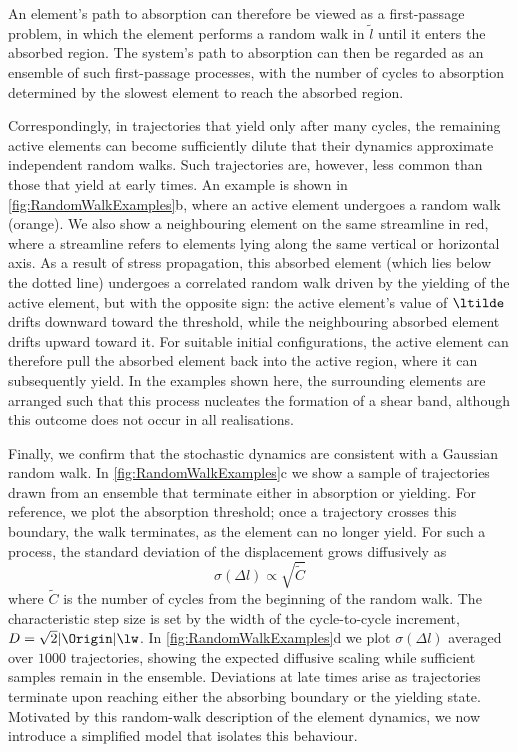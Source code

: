 \documentclass[asymmetricmargins]{library/duthesis}%
\begin{document}
An element’s path to absorption can therefore be viewed as a first-passage problem, in which the element performs a random walk in $\tilde l$ until it enters the absorbed region. The system’s path to absorption can then be regarded as an ensemble of such first-passage processes, with the number of cycles to absorption determined by the slowest element to reach the absorbed region.

Correspondingly, in trajectories that yield only after many cycles, the remaining active elements can become sufficiently dilute that their dynamics approximate independent random walks. Such trajectories are, however, less common than those that yield at early times. An example is shown in \cref{fig:RandomWalkExamples}b, where an active element undergoes a random walk (orange). We also show a neighbouring element on the same streamline in red, where a streamline refers to elements lying along the same vertical or horizontal axis. As a result of stress propagation, this absorbed element (which lies below the dotted line) undergoes a correlated random walk driven by the yielding of the active element, but with the opposite sign: the active element’s value of $\ltilde$ drifts downward toward the threshold, while the neighbouring absorbed element drifts upward toward it. For suitable initial configurations, the active element can therefore pull the absorbed element back into the active region, where it can subsequently yield. In the examples shown here, the surrounding elements are arranged such that this process nucleates the formation of a shear band, although this outcome does not occur in all realisations.

Finally, we confirm that the stochastic dynamics are consistent with a Gaussian random walk. In \cref{fig:RandomWalkExamples}c we show a sample of trajectories drawn from an ensemble that terminate either in absorption or yielding. For reference, we plot the absorption threshold; once a trajectory crosses this boundary, the walk terminates, as the element can no longer yield. For such a process, the standard deviation of the displacement grows diffusively as 
\[
    \sigma(\Delta l) \propto \sqrt{\tilde{C}}
\]
where $\tilde{C}$ is the number of cycles from the beginning of the random walk. The characteristic step size is set by the width of the cycle-to-cycle increment, $D=\sqrt{2}|\Origin|\lw$. In \cref{fig:RandomWalkExamples}d we plot $\sigma(\Delta l)$ averaged over $1000$ trajectories, showing the expected diffusive scaling while sufficient samples remain in the ensemble. Deviations at late times arise as trajectories terminate upon reaching either the absorbing boundary or the yielding state. Motivated by this random-walk description of the element dynamics, we now introduce a simplified model that isolates this behaviour.
\end{document}
